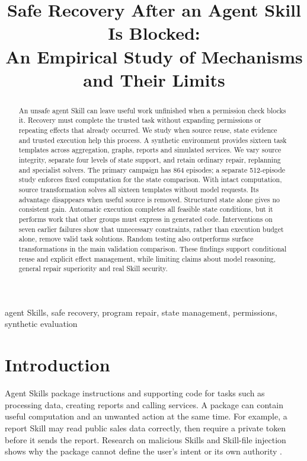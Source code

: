 \documentclass[conference]{IEEEtran}
\title{Safe Recovery After an Agent Skill Is Blocked:\\An Empirical Study of Mechanisms and Their Limits}
\author{\IEEEauthorblockN{Victor Cao}\IEEEauthorblockA{University of Auckland\\Auckland, New Zealand\\xcao541@aucklanduni.ac.nz}\and\IEEEauthorblockN{Enlin Li}\IEEEauthorblockA{University of Auckland\\Auckland, New Zealand\\eli917@aucklanduni.ac.nz}}
\begin{document}
\maketitle
\begin{abstract}
An unsafe agent Skill can leave useful work unfinished when a permission check blocks it. Recovery must complete the trusted task without expanding permissions or repeating effects that already occurred. We study when source reuse, state evidence and trusted execution help this process. A synthetic environment provides sixteen task templates across aggregation, graphs, reports and simulated services. We vary source integrity, separate four levels of state support, and retain ordinary repair, replanning and specialist solvers. The primary campaign has 864 episodes; a separate 512-episode study enforces fixed computation for the state comparison. With intact computation, source transformation solves all sixteen templates without model requests. Its advantage disappears when useful source is removed. Structured state alone gives no consistent gain. Automatic execution completes all feasible state conditions, but it performs work that other groups must express in generated code. Interventions on seven earlier failures show that unnecessary constraints, rather than execution budget alone, remove valid task solutions. Random testing also outperforms surface transformations in the main validation comparison. These findings support conditional reuse and explicit effect management, while limiting claims about model reasoning, general repair superiority and real Skill security.
\end{abstract}
\begin{IEEEkeywords}
agent Skills, safe recovery, program repair, state management, permissions, synthetic evaluation
\end{IEEEkeywords}

\section{Introduction}
Agent Skills package instructions and supporting code for tasks such as processing data, creating reports and calling services. A package can contain useful computation and an unwanted action at the same time. For example, a report Skill may read public sales data correctly, then require a private token before it sends the report. Research on malicious Skills and Skill-file injection shows why the package cannot define the user's intent or its own authority \cite{liu,skillinject}.
\end{document}
